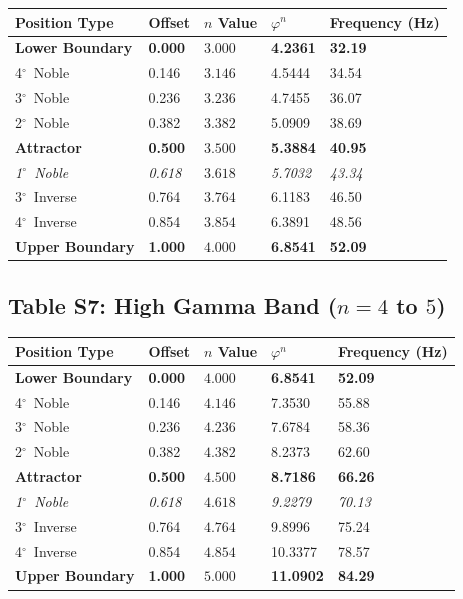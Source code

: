 \documentclass[11pt,a4paper]{article}
\newcommand{\degree}{$^\circ$}  %
\newcommand{\phisym}{\varphi}
\begin{document}
\begin{table}[H]
\centering
\begin{tabular}{@{}lllll@{}}
\toprule
Position Type & Offset & $n$ Value & $\phisym^n$ & Frequency (Hz) \\
\midrule
\textbf{Lower Boundary} & \textbf{0.000} & $\mathbf{3.000}$ & \textbf{4.2361} & \textbf{32.19} \\
4\degree\ Noble & 0.146 & $3.146$ & 4.5444 & 34.54 \\
3\degree\ Noble & 0.236 & $3.236$ & 4.7455 & 36.07 \\
2\degree\ Noble & 0.382 & $3.382$ & 5.0909 & 38.69 \\
\textbf{Attractor} & \textbf{0.500} & $\mathbf{3.500}$ & \textbf{5.3884} & \textbf{40.95} \\
\textit{1\degree\ Noble} & \textit{0.618} & $3.618$ & \textit{5.7032} & \textit{43.34} \\
3\degree\ Inverse & 0.764 & $3.764$ & 6.1183 & 46.50 \\
4\degree\ Inverse & 0.854 & $3.854$ & 6.3891 & 48.56 \\
\textbf{Upper Boundary} & \textbf{1.000} & $\mathbf{4.000}$ & \textbf{6.8541} & \textbf{52.09} \\
\bottomrule
\end{tabular}
\end{table}

\subsection*{Table S7: High Gamma Band ($n = 4$ to $5$)}

\begin{table}[H]
\centering
\begin{tabular}{@{}lllll@{}}
\toprule
Position Type & Offset & $n$ Value & $\phisym^n$ & Frequency (Hz) \\
\midrule
\textbf{Lower Boundary} & \textbf{0.000} & $\mathbf{4.000}$ & \textbf{6.8541} & \textbf{52.09} \\
4\degree\ Noble & 0.146 & $4.146$ & 7.3530 & 55.88 \\
3\degree\ Noble & 0.236 & $4.236$ & 7.6784 & 58.36 \\
2\degree\ Noble & 0.382 & $4.382$ & 8.2373 & 62.60 \\
\textbf{Attractor} & \textbf{0.500} & $\mathbf{4.500}$ & \textbf{8.7186} & \textbf{66.26} \\
\textit{1\degree\ Noble} & \textit{0.618} & $4.618$ & \textit{9.2279} & \textit{70.13} \\
3\degree\ Inverse & 0.764 & $4.764$ & 9.8996 & 75.24 \\
4\degree\ Inverse & 0.854 & $4.854$ & 10.3377 & 78.57 \\
\textbf{Upper Boundary} & \textbf{1.000} & $\mathbf{5.000}$ & \textbf{11.0902} & \textbf{84.29} \\
\bottomrule
\end{tabular}
\end{table}
\end{document}
